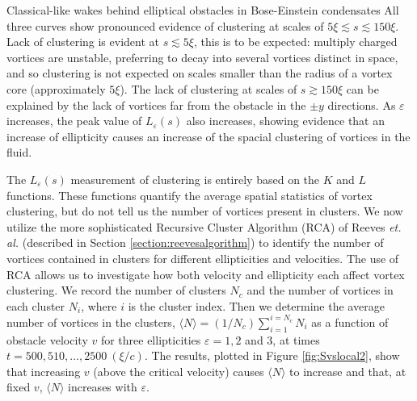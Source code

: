 \begin{chapter}{\label{cha:wake}Classical-like wakes behind elliptical obstacles in Bose-Einstein condensates}
All three curves show pronounced evidence of clustering at scales of $5\xi\lesssim s\lesssim 150\xi$. Lack of clustering is evident at $s\lesssim 5\xi$, this is to be expected: multiply charged vortices are unstable, preferring to decay into several vortices distinct in space, and so clustering is not expected on scales smaller than the radius of a vortex core (approximately $5\xi$). The lack of clustering at scales of $s \gtrsim 150\xi$ can be explained by the lack of vortices far from the obstacle in the $\pm y$ directions. As $\varepsilon$ increases, the peak value of $L_\varepsilon(s)$ also increases, showing evidence that an increase of ellipticity causes an increase of the spacial clustering of vortices in the fluid.

The $L_\varepsilon(s)$ measurement of clustering is entirely based on the $K$ and $L$ functions. These functions quantify the average spatial statistics of vortex clustering, but do not tell us the number of vortices present in clusters. We now utilize the more sophisticated Recursive Cluster Algorithm (RCA) of Reeves \emph{et. al.} \cite{reeves_billam_13} (described in Section \ref{section:reevesalgorithm}) to identify the number of vortices contained in clusters for different ellipticities and velocities. The use of RCA allows us to investigate how both velocity and ellipticity each affect vortex clustering. We record the number of clusters $N_c$ and the number of vortices in each cluster $N_i$, where $i$ is the cluster index. Then we determine the average number of vortices in the clusters, $\langle N \rangle = (1/N_c) \sum_{i=1}^{i=N_c} N_i$ as a function of obstacle velocity $v$ for three ellipticities $\varepsilon=1, 2$ and $3$, at times $t=500,510,\ldots,2500~(\xi/c)$. The results, plotted in Figure \ref{fig:Svslocal2}, show that increasing $v$ (above the critical velocity) causes $\langle N \rangle$ to increase and that, at fixed $v$, $\langle N \rangle$ increases with $\varepsilon$. 


\end{chapter}
